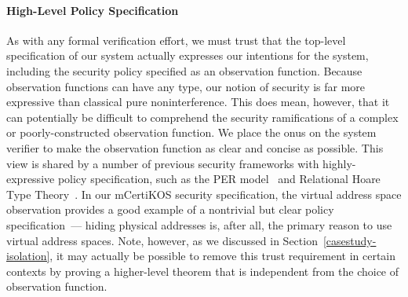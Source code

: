 \paragraph{High-Level Policy Specification}
As with any formal verification effort, we must trust that the top-level 
specification of our system actually expresses our intentions for the system, 
including the security policy specified as 
an observation function. Because observation functions can have any type, 
our notion of security is far more expressive than classical pure 
noninterference. This does mean, however, that it can potentially be 
difficult to comprehend the security ramifications of a complex or 
poorly-constructed observation function. We place the onus on the system
verifier to make the observation function as clear and concise as 
possible. This view is shared by a number of previous security frameworks
with highly-expressive policy specification, such as the PER 
model~\cite{sabelfeld99} and Relational Hoare Type Theory~\cite{rhtt}.
In our mCertiKOS security specification, the virtual address space
observation provides a good example of a nontrivial but
clear policy specification~--- hiding physical addresses is, after all,
the primary reason to use virtual address spaces. Note, however,
as we discussed in Section~\ref{casestudy-isolation}, it may actually
be possible to remove this trust requirement in certain contexts by
proving a higher-level theorem that is independent from the choice
of observation function.

